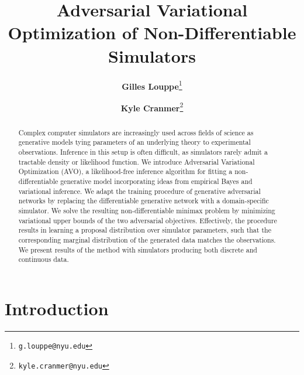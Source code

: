 \documentclass[twocolumn,superscriptaddress,aps]{revtex4-1}
\theoremstyle{plain}
\begin{document}

\title{\Large{Adversarial Variational Optimization of Non-Differentiable Simulators}}
\vspace{1cm}
\author{\small{\bf Gilles Louppe}\thanks{\texttt{g.louppe@nyu.edu}}}
\author{\small{\bf Kyle Cranmer}\thanks{\texttt{kyle.cranmer@nyu.edu}}}

\begin{abstract}
Complex computer simulators are increasingly used across fields of science as
generative models tying parameters of an underlying theory to
experimental observations. Inference in this setup is often
difficult, as simulators rarely admit a tractable density or likelihood
function. We introduce Adversarial Variational Optimization (AVO), a likelihood-free
inference algorithm for fitting a non-differentiable generative model incorporating ideas from empirical Bayes and variational inference.
We adapt the training procedure of generative
adversarial networks by replacing the differentiable generative network with a
domain-specific simulator. We solve the resulting non-differentiable
minimax problem by minimizing variational upper bounds of the two adversarial objectives.
Effectively, the procedure results in learning a
proposal distribution over simulator parameters, such that the corresponding
marginal distribution of the generated data matches the observations.
We present results of the method with simulators producing both discrete and continuous data.

\end{abstract}

\maketitle


\section{Introduction}

\end{document}
